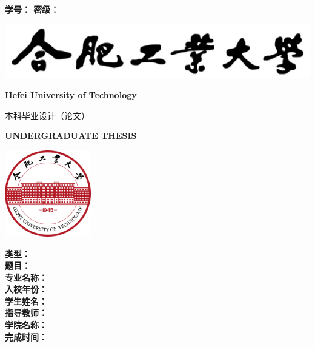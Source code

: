 \begin{titlepage}
    {
        \heiti \bfseries
        学\hspace{1.5em}号：\underlineFixlen[3.5cm]{\studentID} \hfill
        密\hspace{1.5em}级：\underlineFixlen[3.5cm]{\privacy}
    }

    \centering
    {\vspace{1.7cm} \includegraphics{img/hfut_name.png}\vspace{0.3cm}}

    {\LARGE \bfseries Hefei University of Technology}\vspace{1cm}

    {\chuhao \heiti 本科毕业设计（论文）}\vspace{0.7cm}

    {\LARGE \bfseries UNDERGRADUATE THESIS}\vspace{0.9cm}

    {\includegraphics[width=3.76cm, height=3.76cm]{img/hfut_logo.png}\vspace{0.5cm}}

    {
    \linespread{1.25}
    \songti \sanhao
    {\bfseries 类\hspace{2em}型：}\underlineFixlen[8.8cm]{\type}\\
    {\bfseries 题\hspace{2em}目：}\underlineFixlen[8.8cm]{\titleCn}\\
    {\bfseries 专业名称：}\underlineFixlen[8.8cm]{\major}\\
    {\bfseries 入校年份：}\underlineFixlen[8.8cm]{\enrolmentYear}\\
    {\bfseries 学生姓名：}\underlineFixlen[8.8cm]{\studentNameCn}\\
    {\bfseries 指导教师：}\underlineFixlen[8.8cm]{\supervisor}\\
    {\bfseries 学院名称：}\underlineFixlen[8.8cm]{\department}\\
    {\bfseries 完成时间：}\\
    }
\end{titlepage}

